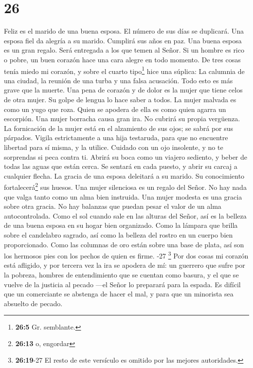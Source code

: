 \hypertarget{section-25}{%
\section{26}\label{section-25}}

 Feliz es el marido de una buena esposa. El número de sus
días se duplicará.  Una esposa fiel da alegría a su
marido. Cumplirá sus años en paz.  Una buena esposa es un
gran regalo. Será entregada a los que temen al Señor.  Si
un hombre es rico o pobre, un buen corazón hace una cara alegre en todo
momento.  De tres cosas tenía miedo mi corazón, y sobre el
cuarto tipo\footnote{\textbf{26:5} Gr. semblante.} hice una súplica: La
calumnia de una ciudad, la reunión de una turba y una falsa acusación.
Todo esto es más grave que la muerte.  Una pena de corazón
y de dolor es la mujer que tiene celos de otra mujer. Su golpe de lengua
lo hace saber a todos.  La mujer malvada es como un yugo
que roza. Quien se apodera de ella es como quien agarra un escorpión.
 Una mujer borracha causa gran ira. No cubrirá su propia
vergüenza.  La fornicación de la mujer está en el
alzamiento de sus ojos; se sabrá por sus párpados. 
Vigila estrictamente a una hija testaruda, para que no encuentre
libertad para sí misma, y la utilice.  Cuidado con un ojo
insolente, y no te sorprendas si peca contra ti.  Abrirá
su boca como un viajero sediento, y beber de todas las aguas que están
cerca. Se sentará en cada puesto, y abrir su carcaj a cualquier flecha.
 La gracia de una esposa deleitará a su marido. Su
conocimiento fortalecerá\footnote{\textbf{26:13} o, engordar} sus
huesos.  Una mujer silenciosa es un regalo del Señor. No
hay nada que valga tanto como un alma bien instruida. 
Una mujer modesta es una gracia sobre otra gracia. No hay balanzas que
puedan pesar el valor de un alma autocontrolada.  Como el
sol cuando sale en las alturas del Señor, así es la belleza de una buena
esposa en su hogar bien organizado.  Como la lámpara que
brilla sobre el candelabro sagrado, así como la belleza del rostro en un
cuerpo bien proporcionado.  Como las columnas de oro
están sobre una base de plata, así son los hermosos pies con los pechos
de quien es firme. -27 \footnote{\textbf{26:19}-27 El
  resto de este versículo es omitido por las mejores autoridades.}
 Por dos cosas mi corazón está afligido, y por tercera
vez la ira se apodera de mí: un guerrero que sufre por la pobreza,
hombres de entendimiento que se cuentan como basura, y el que se vuelve
de la justicia al pecado ---el Señor lo preparará para la espada.
 Es difícil que un comerciante se abstenga de hacer el
mal, y para que un minorista sea absuelto de pecado.


